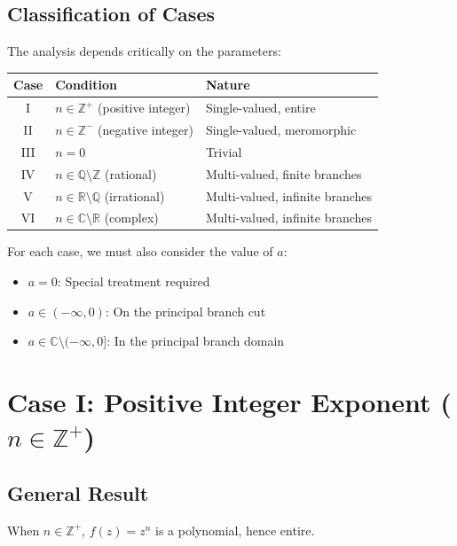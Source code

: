 \documentclass{article}
\theoremstyle{definition}
\theoremstyle{remark}
\newcommand{\C}{\mathbb{C}}
\newcommand{\R}{\mathbb{R}}
\newcommand{\Z}{\mathbb{Z}}
\newcommand{\Q}{\mathbb{Q}}
\begin{document}
\subsection{Classification of Cases}

The analysis depends critically on the parameters:

\begin{center}
\renewcommand{\arraystretch}{1.4}
\begin{tabular}{|c|l|l|}
\hline
\textbf{Case} & \textbf{Condition} & \textbf{Nature} \\
\hline
I & $n \in \Z^+$ (positive integer) & Single-valued, entire \\
II & $n \in \Z^-$ (negative integer) & Single-valued, meromorphic \\
III & $n = 0$ & Trivial \\
IV & $n \in \Q \setminus \Z$ (rational) & Multi-valued, finite branches \\
V & $n \in \R \setminus \Q$ (irrational) & Multi-valued, infinite branches \\
VI & $n \in \C \setminus \R$ (complex) & Multi-valued, infinite branches \\
\hline
\end{tabular}
\end{center}

For each case, we must also consider the value of $a$:
\begin{itemize}
    \item $a = 0$: Special treatment required
    \item $a \in (-\infty, 0)$: On the principal branch cut
    \item $a \in \C \setminus (-\infty, 0]$: In the principal branch domain
\end{itemize}

\section{Case I: Positive Integer Exponent ($n \in \Z^+$)}

\subsection{General Result}

When $n \in \Z^+$, $f(z) = z^n$ is a polynomial, hence entire.
\end{document}
